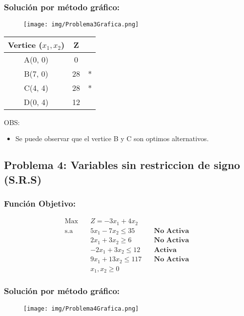 \documentclass{templateNote}
\begin{document}
\subsubsection*{Solución por método gráfico:}
\begin{figure}[H]
    \centering
    \texttt{[image: img/Problema3Grafica.png]}
\end{figure}
\begin{center}
    \begin{tabular}{|c|c|c|}
        \hline
        \textbf{Vertice ($x_1,x_2$)} & Z &  \\ \hline
        A(0, 0) & 0 & \\ \hline
        B(7, 0) & 28 & * \\ \hline
        C(4, 4) & 28 & * \\ \hline
        D(0, 4) & 12 & \\ \hline
    \end{tabular}
\end{center}
OBS:
\begin{itemize}
    \item Se puede observar que el vertice B y C son optimos alternativos.
\end{itemize}

\newpage
\subsection*{Problema 4: Variables sin restriccion de signo (S.R.S)}
\subsubsection*{Función Objetivo:}
\begin{equation*}
    \begin{aligned}
        \text{Max} \quad & Z = -3x_1 + 4x_2 \\
        \text{s.a} \quad & 5x_1 - 7x_2 \leq 35 \quad &\textbf{No Activa} \\
        & 2x_1 + 3x_2 \geq 6 \quad &\textbf{No Activa} \\
        & -2x_1 + 3x_2 \leq 12 \quad &\textbf{Activa} \\
        & 9x_1 + 13x_2 \leq 117 \quad &\textbf{No Activa} \\
        & x_1, x_2 \geq 0
    \end{aligned}
\end{equation*}

\subsubsection*{Solución por método gráfico:}
\begin{figure}[H]
    \centering
    \texttt{[image: img/Problema4Grafica.png]}
\end{figure}
\end{document}
